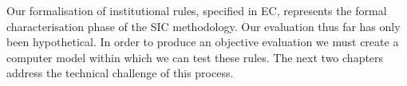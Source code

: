 Our formalisation of institutional rules, specified in \ac{EC}, represents the formal characterisation phase of the \ac{SIC} methodology. Our evaluation thus far has only been hypothetical. In order to produce an objective evaluation we must create a computer model within which we can test these rules. The next two chapters address the technical challenge of this process.




